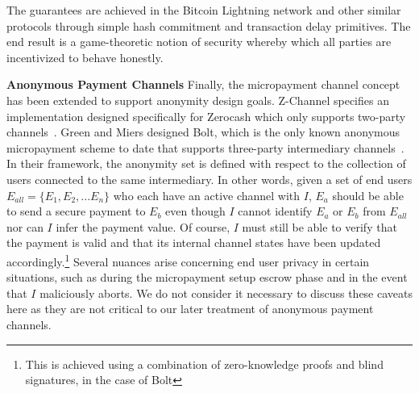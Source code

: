 The guarantees are achieved in the Bitcoin Lightning network and other similar
protocols through simple hash commitment and transaction delay primitives. The
end result is a game-theoretic notion of security whereby which all parties are
incentivized to behave honestly.

\textbf{Anonymous Payment Channels} Finally, the micropayment channel concept
has been extended to support anonymity design goals. Z-Channel specifies an
implementation designed specifically for Zerocash which only supports two-party
channels~\cite{zhang2017z}. Green and Miers designed Bolt, which is the only
known anonymous micropayment scheme to date that supports three-party
intermediary channels~\cite{green2017bolt}. In their framework, the anonymity
set is defined with respect to the collection of users connected to the same
intermediary. In other words, given a set of end users
$E_{all} = \{E_1, E_2, ... E_n\}$ who each have an active channel with $I$,
$E_a$ should be able to send a secure payment to $E_b$ even though $I$ cannot
identify $E_a$ or $E_b$ from $E_{all}$ nor can $I$ infer the payment value. Of
course, $I$ must still be able to verify that the payment is valid and that its
internal channel states have been updated accordingly.\footnote{This is achieved
  using a combination of zero-knowledge proofs and blind signatures, in the case
  of Bolt} Several nuances arise concerning end user privacy in certain
situations, such as during the micropayment setup escrow phase and in the event
that $I$ maliciously aborts. We do not consider it necessary to discuss these
caveats here as they are not critical to our later treatment of anonymous
payment channels.